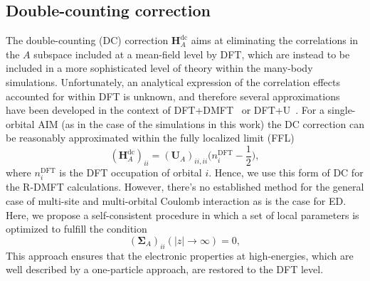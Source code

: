 \documentclass[aps,prx,twocolumn,superscriptaddress]{revtex4-2}
\newcommand{\AV}[1]{{\textcolor{purple}{#1}}}
\begin{document}
\subsection{Double-counting correction} \label{sec:dc}
The double-counting (DC) correction $\mathbf{H}^{\mathrm{dc}}_A$ aims at eliminating the correlations in the $A$ subspace included at a mean-field level by DFT, which are instead to be included in a more sophisticated level of theory within the many-body simulations. %
Unfortunately, %
an analytical expression of the correlation effects accounted for within DFT is unknown,
and therefore several approximations~\cite{anisimov1991band,czyzyk1994local,karolak2010double,jacobPRB82} have been developed in the context of DFT+DMFT~\cite{kotliar2006electronic,held2007electronic} or DFT+U~\cite{anisimov1997first,petukhov2003correlated}. 
For a single-orbital AIM (as in the case of the simulations in this work) the DC correction can be reasonably approximated within the fully localized limit (FFL)~\cite{liechtenstein1995density,anisimov1993density,czyzyk1994local,solovyev1994corrected}
\begin{equation}
    \left( \mathbf{H}^{\mathrm{dc}}_A \right)_{ii} = (\mathbf{U}_A)_{ii,ii} \bigg(n^{\mathrm{DFT}}_i - \frac{1}{2} \bigg),
\end{equation}
where $n^{\mathrm{DFT}}_i$ is the DFT occupation of orbital $i$.
Hence, we use this form of DC for the R-DMFT calculations. 
However, there's no established method for the general case of multi-site and multi-orbital Coulomb interaction 
as is the case for ED. 
Here, we propose a self-consistent procedure 
in which a set of local parameters 
is optimized to fulfill the condition
\begin{equation}
    (\mathbf{\Sigma}_A)_{ii}(|z|\to\infty) = 0,
\end{equation}
This approach ensures that the electronic properties at high-energies, which are well described by a one-particle approach, are restored to the DFT level. 
\end{document}

